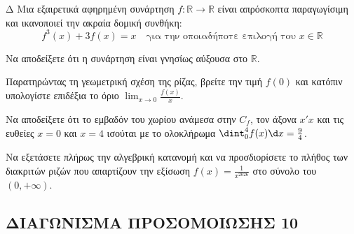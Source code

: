 \begin{thema}{Δ}
Μια εξαιρετικά αφηρημένη συνάρτηση $f: \mathbb{R} \to \mathbb{R}$ είναι απρόσκοπτα παραγωγίσιμη και ικανοποιεί την ακραία δομική συνθήκη:
\[ f^3(x) + 3f(x) = x \quad \text{για την οποιαδήποτε επιλογή του } x \in \mathbb{R} \]
\begin{erwthma}
    \item Να αποδείξετε ότι η συνάρτηση είναι γνησίως αύξουσα στο $\mathbb{R}$. 
    \item Παρατηρώντας τη γεωμετρική σχέση της ρίζας, βρείτε την τιμή $f(0)$ και κατόπιν υπολογίστε επιδέξια το όριο $\displaystyle\lim_{x\to 0} \frac{f(x)}{x}$. 
    \item Να αποδείξετε ότι το εμβαδόν του χωρίου ανάμεσα στην $C_f$, τον άξονα $x'x$ και τις ευθείες $x=0$ και $x=4$ ισούται με το ολοκλήρωμα $\dint_0^4 f(x) \d x = \frac{9}{4}$. 
    \item Να εξετάσετε πλήρως την αλγεβρική κατανομή και να προσδιορίσετε το πλήθος των διακριτών ριζών που απαρτίζουν την εξίσωση $f(x) = \frac{1}{x^{2026}}$ στο σύνολο του $(0, +\infty)$. 
\end{erwthma}
\end{thema}

\newpage
\subsection{ΔΙΑΓΩΝΙΣΜΑ ΠΡΟΣΟΜΟΙΩΣΗΣ 10}

